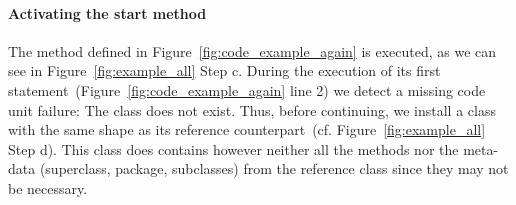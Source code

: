 
\paragraph{Activating the start method}
The method  defined in Figure~\ref{fig:code_example_again} is executed, as we can see in Figure~\ref{fig:example_all} Step c. During the execution of its first statement~(Figure~\ref{fig:code_example_again} line 2) we detect a missing code unit failure: The  class does not exist. Thus, before continuing, we install a  class with the same shape as its reference counterpart~(cf. Figure~\ref{fig:example_all} Step d). This class does contains however neither all the methods nor the meta-data (\eg superclass, package, subclasses) from the reference class since they may not be necessary.





